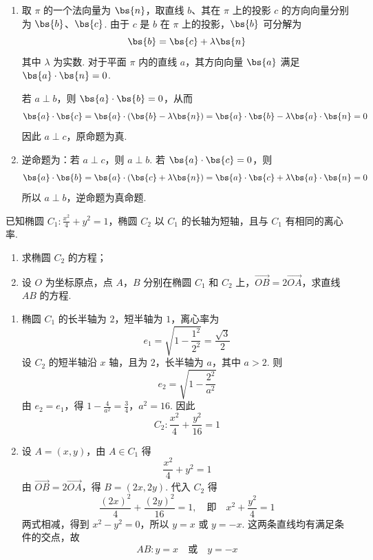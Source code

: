 \begin{solution}
\begin{enumerate}
\item 取 \(\pi\) 的一个法向量为 \(\bs{n}\)，取直线 \(b\)、其在 \(\pi\) 上的投影 \(c\) 的方向向量分别为 \(\bs{b}\)、\(\bs{c}\). 由于 \(c\) 是 \(b\) 在 \(\pi\) 上的投影，\(\bs{b}\) 可分解为
\[
\bs{b}=\bs{c}+\lambda\bs{n}
\]
其中 \(\lambda\) 为实数. 对于平面 \(\pi\) 内的直线 \(a\)，其方向向量 \(\bs{a}\) 满足 \(\bs{a}\cdot\bs{n}=0\).

若 \(a\perp b\)，则 \(\bs{a}\cdot\bs{b}=0\)，从而
\[
\bs{a}\cdot\bs{c}
=\bs{a}\cdot(\bs{b}-\lambda\bs{n})
=\bs{a}\cdot\bs{b}-\lambda\bs{a}\cdot\bs{n}=0
\]
因此 \(a\perp c\)，原命题为真.

\item 逆命题为：若 \(a\perp c\)，则 \(a\perp b\). 若 \(\bs{a}\cdot\bs{c}=0\)，则
\[
\bs{a}\cdot\bs{b}
=\bs{a}\cdot(\bs{c}+\lambda\bs{n})
=\bs{a}\cdot\bs{c}+\lambda\bs{a}\cdot\bs{n}=0
\]
所以 \(a\perp b\)，逆命题为真命题.
\end{enumerate}
\end{solution}

\begin{problem}
已知椭圆 \(C_1: \frac{x^2}{4} + y^2 = 1\)，椭圆 \(C_2\) 以 \(C_1\) 的长轴为短轴，且与 \(C_1\) 有相同的离心率.

\begin{enumerate}
\item 求椭圆 \(C_2\) 的方程；
\item 设 \(O\) 为坐标原点，点 \(A\)，\(B\) 分别在椭圆 \(C_1\) 和 \(C_2\) 上，\(\overrightarrow{OB} = 2\overrightarrow{OA}\)，求直线 \(AB\) 的方程.
\end{enumerate}
\end{problem}

\begin{solution}
\begin{enumerate}
\item 椭圆 \(C_1\) 的长半轴为 \(2\)，短半轴为 \(1\)，离心率为
\[
e_1=\sqrt{1-\frac{1^2}{2^2}}=\frac{\sqrt3}{2}
\]
设 \(C_2\) 的短半轴沿 \(x\) 轴，且为 \(2\)，长半轴为 \(a\)，其中 \(a>2\). 则
\[
e_2=\sqrt{1-\frac{2^2}{a^2}}
\]
由 \(e_2=e_1\)，得
\(1-\frac4{a^2}=\frac34\)，\(a^2=16\).
因此
\[
C_2:\frac{x^2}{4}+\frac{y^2}{16}=1
\]

\item 设 \(A=(x,y)\)，由 \(A\in C_1\) 得
\[
\frac{x^2}{4}+y^2=1
\]
由 \(\overrightarrow{OB}=2\overrightarrow{OA}\)，得 \(B=(2x,2y)\). 代入 \(C_2\) 得
\[
\frac{(2x)^2}{4}+\frac{(2y)^2}{16}=1,
\quad\text{即}\quad x^2+\frac{y^2}{4}=1
\]
两式相减，得到 \(x^2-y^2=0\)，所以 \(y=x\) 或 \(y=-x\). 这两条直线均有满足条件的交点，故
\[
AB:y=x\quad\text{或}\quad y=-x
\]
\end{enumerate}
\end{solution}

